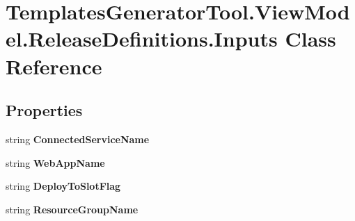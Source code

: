 \hypertarget{class_templates_generator_tool_1_1_view_model_1_1_release_definitions_1_1_inputs}{}\section{Templates\+Generator\+Tool.\+View\+Model.\+Release\+Definitions.\+Inputs Class Reference}
\label{class_templates_generator_tool_1_1_view_model_1_1_release_definitions_1_1_inputs}
\subsection*{Properties}
\begin{DoxyCompactItemize}
\item 
\mbox{\label{class_templates_generator_tool_1_1_view_model_1_1_release_definitions_1_1_inputs_a80a5b29088cc4e68e1ec9bd97040686b}} 
string {\bfseries Connected\+Service\+Name}
\item 
\mbox{\label{class_templates_generator_tool_1_1_view_model_1_1_release_definitions_1_1_inputs_a9c2310b2e692e7619d1d8a0a9e22c691}} 
string {\bfseries Web\+App\+Name}
\item 
\mbox{\label{class_templates_generator_tool_1_1_view_model_1_1_release_definitions_1_1_inputs_a386e960889fb64ab1b958f8615563505}} 
string {\bfseries Deploy\+To\+Slot\+Flag}
\item 
\mbox{\label{class_templates_generator_tool_1_1_view_model_1_1_release_definitions_1_1_inputs_abcaa909187fd91431ff416da5beed3c5}} 
string {\bfseries Resource\+Group\+Name}

\end{DoxyCompactItemize}
